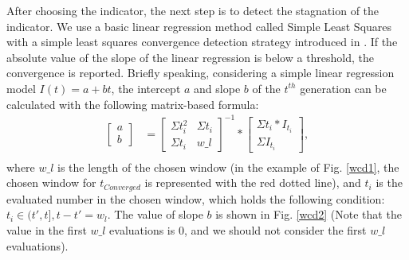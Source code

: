 \documentclass[conference]{IEEEtran}
\begin{document}
After choosing the indicator, the next step is to detect the stagnation of the indicator.
We use a basic linear regression method called Simple Least Squares\cite{SimpleLeastSquares} with a
simple least squares convergence detection strategy introduced in \cite{convergenceDetection:LSSC}.
If the absolute value of the slope of the linear regression is below a threshold, the convergence is reported.
Briefly speaking, considering a simple linear regression model $I(t)=a+bt$, 
the intercept $a$ and slope $b$ of the $t^{th}$ generation can be calculated 
with the following matrix-based formula:
\begin{equation}\begin{aligned}\label{elr1}
  \left[
    \begin{matrix}
      a \\
      b
    \end{matrix}
  \right]
  &= 
  \left[
    \begin{matrix}
      \Sigma t_i^2 & \Sigma t_i \\
      \Sigma t_i   & w\_l 
    \end{matrix}
  \right]^{-1}
  *
  \left[
    \begin{matrix}
      \Sigma t_i * I_{t_i} \\
      \Sigma I_{t_i} 
    \end{matrix}
  \right], \\
\end{aligned}
\end{equation}
where $w\_ l$ is the length of the chosen window
(in the example of Fig. \ref{wcd1}, the chosen window for $t_{Converged}$ is represented with the red dotted line), 
and $t_i$ is the evaluated number in the chosen window, 
which holds the following condition: $t_i \in (t',t], t - t' = w_l$.
The value of slope $b$ is shown in Fig. \ref{wcd2} 
(Note that the value in the first $w\_ l$ evaluations is 0, 
and we should not consider the first $w\_ l$ evaluations). 
\end{document}
